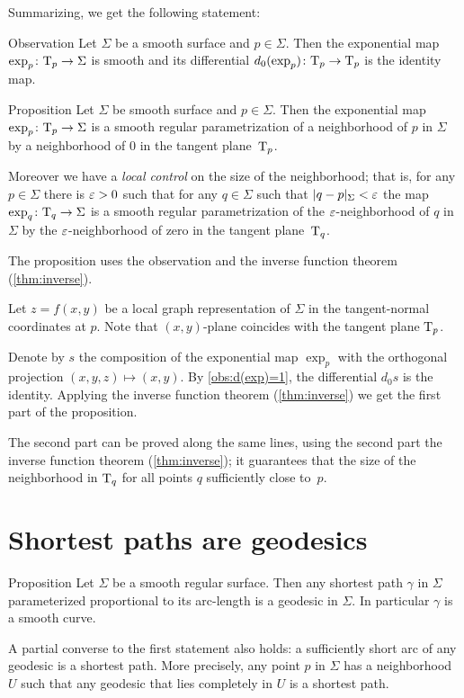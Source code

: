 Summarizing, we get the following statement:

\begin{thm}{Observation}\label{obs:d(exp)=1}
Let $\Sigma$ be a smooth surface and $p\in \Sigma$.
Then the exponential map $\exp_p\colon\mathrm{T}_p\to \Sigma$ is smooth and its differential $d_0(\exp_p)\colon\mathrm{T}_p\to \mathrm{T}_p$ is the identity map. 
\end{thm}


\begin{thm}{Proposition}\label{prop:exp}
Let $\Sigma$ be smooth surface and $p\in \Sigma$.
Then the exponential map $\exp_p\colon\mathrm{T}_p\to \Sigma$ is a smooth regular parametrization of a neighborhood of $p$ in $\Sigma$ by a neighborhood of $0$ in the tangent plane~$\mathrm{T}_p$.

Moreover we have a {}\emph{local control} on the size of the neighborhood;
that is, for any $p\in \Sigma$ there is $\varepsilon>0$ such that for any $q\in \Sigma$ such that $|q-p|_\Sigma<\varepsilon$ the map 
$\exp_q\colon\mathrm{T}_q\to \Sigma$ is a smooth regular parametrization of the $\varepsilon$-neighborhood of $q$ in $\Sigma$ by the $\varepsilon$-neighborhood of zero in the tangent plane~$\mathrm{T}_q$.
\end{thm}

The proposition uses the observation and the inverse function theorem (\ref{thm:inverse}). %

Let $z=f(x,y)$ be a local graph representation of $\Sigma$ in the tangent-normal coordinates at $p$.
Note that $(x,y)$-plane coincides with the tangent plane $\mathrm{T}_p$.

Denote by $s$ the composition of  the exponential map $\exp_p$ with the orthogonal projection $(x,y,z)\mapsto (x,y)$.
By \ref{obs:d(exp)=1}, the differential $d_0s$ is the identity.
Applying the inverse function theorem (\ref{thm:inverse}) we get the first part of the proposition.

The second part can be proved along the same lines, using the second part the inverse function theorem (\ref{thm:inverse});
it guarantees that the size of the neighborhood in $\mathrm{T}_q$ for all points $q$ sufficiently close to~$p$.
\qeds

\section{Shortest paths are geodesics}

\begin{thm}{Proposition}\label{prop:gamma''}
Let $\Sigma$ be a smooth regular surface.
Then any shortest path $\gamma$ in $\Sigma$ parameterized proportional to its arc-length is a geodesic in $\Sigma$.
In particular $\gamma$ is a smooth curve.

A partial converse to the first statement also holds: a sufficiently short arc of any geodesic is a shortest path.
More precisely, any point $p$ in $\Sigma$ has a neighborhood $U$ such that any geodesic that lies completely in $U$ is a shortest path.
\end{thm}

